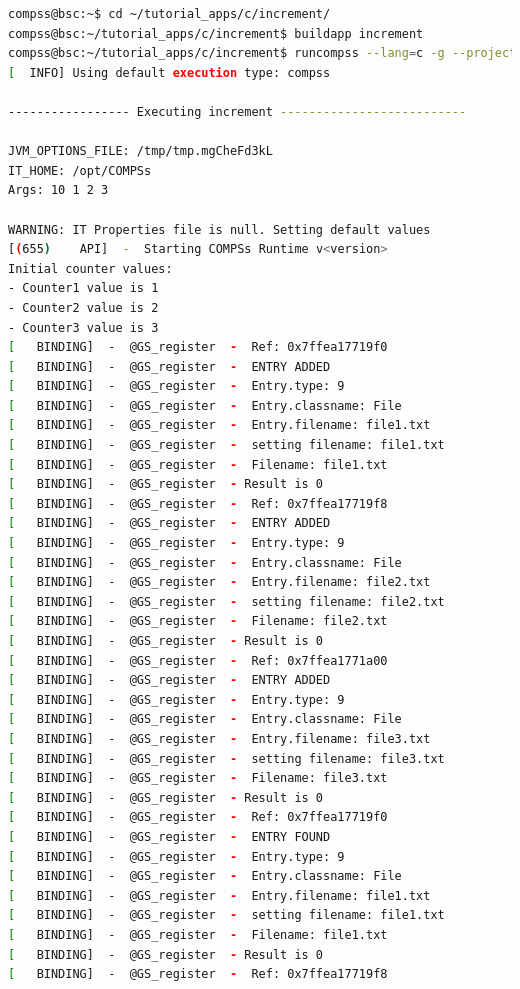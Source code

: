 \begin{lstlisting}[language=bash]
compss@bsc:~$ cd ~/tutorial_apps/c/increment/
compss@bsc:~/tutorial_apps/c/increment$ buildapp increment
compss@bsc:~/tutorial_apps/c/increment$ runcompss --lang=c -g --project=./xml/project.xml --resources=./xml/resources.xml ~/tutorial_apps/c/increment/master/increment 10 1 2 3
[  INFO] Using default execution type: compss

----------------- Executing increment --------------------------

JVM_OPTIONS_FILE: /tmp/tmp.mgCheFd3kL
IT_HOME: /opt/COMPSs
Args: 10 1 2 3
 
WARNING: IT Properties file is null. Setting default values
[(655)    API]  -  Starting COMPSs Runtime v<version>
Initial counter values: 
- Counter1 value is 1
- Counter2 value is 2
- Counter3 value is 3
[   BINDING]  -  @GS_register  -  Ref: 0x7ffea17719f0
[   BINDING]  -  @GS_register  -  ENTRY ADDED
[   BINDING]  -  @GS_register  -  Entry.type: 9
[   BINDING]  -  @GS_register  -  Entry.classname: File
[   BINDING]  -  @GS_register  -  Entry.filename: file1.txt
[   BINDING]  -  @GS_register  -  setting filename: file1.txt
[   BINDING]  -  @GS_register  -  Filename: file1.txt
[   BINDING]  -  @GS_register  - Result is 0
[   BINDING]  -  @GS_register  -  Ref: 0x7ffea17719f8
[   BINDING]  -  @GS_register  -  ENTRY ADDED
[   BINDING]  -  @GS_register  -  Entry.type: 9
[   BINDING]  -  @GS_register  -  Entry.classname: File
[   BINDING]  -  @GS_register  -  Entry.filename: file2.txt
[   BINDING]  -  @GS_register  -  setting filename: file2.txt
[   BINDING]  -  @GS_register  -  Filename: file2.txt
[   BINDING]  -  @GS_register  - Result is 0
[   BINDING]  -  @GS_register  -  Ref: 0x7ffea1771a00
[   BINDING]  -  @GS_register  -  ENTRY ADDED
[   BINDING]  -  @GS_register  -  Entry.type: 9
[   BINDING]  -  @GS_register  -  Entry.classname: File
[   BINDING]  -  @GS_register  -  Entry.filename: file3.txt
[   BINDING]  -  @GS_register  -  setting filename: file3.txt
[   BINDING]  -  @GS_register  -  Filename: file3.txt
[   BINDING]  -  @GS_register  - Result is 0
[   BINDING]  -  @GS_register  -  Ref: 0x7ffea17719f0
[   BINDING]  -  @GS_register  -  ENTRY FOUND
[   BINDING]  -  @GS_register  -  Entry.type: 9
[   BINDING]  -  @GS_register  -  Entry.classname: File
[   BINDING]  -  @GS_register  -  Entry.filename: file1.txt
[   BINDING]  -  @GS_register  -  setting filename: file1.txt
[   BINDING]  -  @GS_register  -  Filename: file1.txt
[   BINDING]  -  @GS_register  - Result is 0
[   BINDING]  -  @GS_register  -  Ref: 0x7ffea17719f8

\end{lstlisting}
